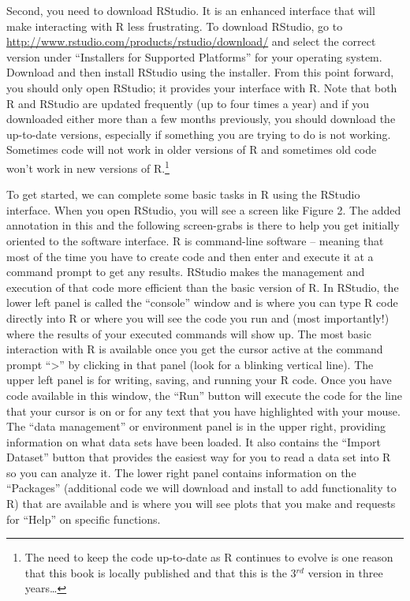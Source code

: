 \documentclass[]{book}
\let\rmarkdownfootnote\footnote%
\def\footnote{\protect\rmarkdownfootnote}
\begin{document}
Second, you need to download RStudio. It is an enhanced interface that
will make interacting with R less frustrating. To download RStudio, go
to \url{http://www.rstudio.com/products/rstudio/download/} and select
the correct version under ``Installers for Supported Platforms'' for
your operating system. Download and then install RStudio using the
installer. From this point forward, you should only open RStudio; it
provides your interface with R. Note that both R and RStudio are updated
frequently (up to four times a year) and if you downloaded either more
than a few months previously, you should download the up-to-date
versions, especially if something you are trying to do is not working.
Sometimes code will not work in older versions of R and sometimes old
code won't work in new versions of R.\footnote{The need to keep the code
  up-to-date as R continues to evolve is one reason that this book is
  locally published and that this is the 3\(^{rd}\) version in three
  years\ldots{}}

To get started, we can complete some basic tasks in R using the RStudio
interface. When you open RStudio, you will see a screen like Figure 2.
The added annotation in this and the following screen-grabs is there to
help you get initially oriented to the software interface. R is
command-line software -- meaning that most of the time you have to
create code and then enter and execute it at a command prompt to get any
results. RStudio makes the management and execution of that code more
efficient than the basic version of R. In RStudio, the lower left panel
is called the ``console'' window and is where you can type R code
directly into R or where you will see the code you run and (most
importantly!) where the results of your executed commands will show up.
The most basic interaction with R is available once you get the cursor
active at the command prompt ``\textgreater{}'' by clicking in that
panel (look for a blinking vertical line). The upper left panel is for
writing, saving, and running your R code. Once you have code available
in this window, the ``Run'' button will execute the code for the line
that your cursor is on or for any text that you have highlighted with
your mouse. The ``data management'' or environment panel is in the upper
right, providing information on what data sets have been loaded. It also
contains the ``Import Dataset'' button that provides the easiest way for
you to read a data set into R so you can analyze it. The lower right
panel contains information on the ``Packages'' (additional code we will
download and install to add functionality to R) that are available and
is where you will see plots that you make and requests for ``Help'' on
specific functions.
\end{document}
